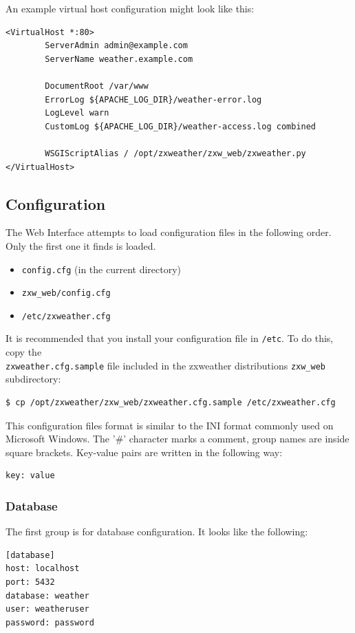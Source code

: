 \documentclass[a4paper,10pt,draft]{book}
\begin{document}
An example virtual host configuration might look like this:

\begin{verbatim}
<VirtualHost *:80>
        ServerAdmin admin@example.com
        ServerName weather.example.com

        DocumentRoot /var/www
        ErrorLog ${APACHE_LOG_DIR}/weather-error.log
        LogLevel warn
        CustomLog ${APACHE_LOG_DIR}/weather-access.log combined

        WSGIScriptAlias / /opt/zxweather/zxw_web/zxweather.py
</VirtualHost>
\end{verbatim}

\subsection{Configuration}

The Web Interface attempts to load configuration files in the following order. Only the first one it finds is loaded.
\begin{itemize}
\item \verb|config.cfg| (in the current directory)
\item \verb|zxw_web/config.cfg|
\item \verb|/etc/zxweather.cfg|
\end{itemize}

It is recommended that you install your configuration file in \verb|/etc|. To do this, copy the \\ \verb|zxweather.cfg.sample| file included in the zxweather distributions \verb|zxw_web| subdirectory:
\begin{verbatim}
$ cp /opt/zxweather/zxw_web/zxweather.cfg.sample /etc/zxweather.cfg
\end{verbatim}

This configuration files format is similar to the INI format commonly used on Microsoft Windows. The '\#' character marks a comment, group names are inside square brackets. Key-value pairs are written in the following way:
\begin{verbatim}
key: value
\end{verbatim}

\subsubsection{Database}
The first group is for database configuration. It looks like the following:
\begin{verbatim}
[database]
host: localhost
port: 5432
database: weather
user: weatheruser
password: password
\end{verbatim}
\end{document}
